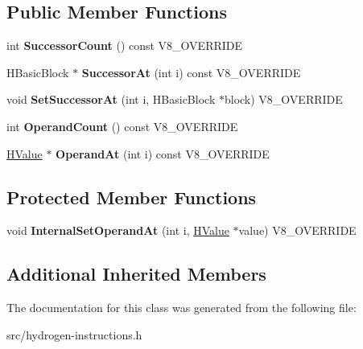 \subsection*{Public Member Functions}
\begin{DoxyCompactItemize}
\item 
\hypertarget{classv8_1_1internal_1_1_h_template_control_instruction_acdac81ca169a1b96efdbdea7b835a503}{}int {\bfseries Successor\+Count} () const V8\+\_\+\+O\+V\+E\+R\+R\+I\+D\+E\label{classv8_1_1internal_1_1_h_template_control_instruction_acdac81ca169a1b96efdbdea7b835a503}

\item 
\hypertarget{classv8_1_1internal_1_1_h_template_control_instruction_a0594d3ba5bd3118a89b14a082b179407}{}H\+Basic\+Block $\ast$ {\bfseries Successor\+At} (int i) const V8\+\_\+\+O\+V\+E\+R\+R\+I\+D\+E\label{classv8_1_1internal_1_1_h_template_control_instruction_a0594d3ba5bd3118a89b14a082b179407}

\item 
\hypertarget{classv8_1_1internal_1_1_h_template_control_instruction_a310afaf5b5b076b110d1168996643b4e}{}void {\bfseries Set\+Successor\+At} (int i, H\+Basic\+Block $\ast$block) V8\+\_\+\+O\+V\+E\+R\+R\+I\+D\+E\label{classv8_1_1internal_1_1_h_template_control_instruction_a310afaf5b5b076b110d1168996643b4e}

\item 
\hypertarget{classv8_1_1internal_1_1_h_template_control_instruction_a6c53efb11248447ebe4adbe166bff1d8}{}int {\bfseries Operand\+Count} () const V8\+\_\+\+O\+V\+E\+R\+R\+I\+D\+E\label{classv8_1_1internal_1_1_h_template_control_instruction_a6c53efb11248447ebe4adbe166bff1d8}

\item 
\hypertarget{classv8_1_1internal_1_1_h_template_control_instruction_a32a7182de377f0a8c884d0fc6a7eb691}{}\hyperlink{classv8_1_1internal_1_1_h_value}{H\+Value} $\ast$ {\bfseries Operand\+At} (int i) const V8\+\_\+\+O\+V\+E\+R\+R\+I\+D\+E\label{classv8_1_1internal_1_1_h_template_control_instruction_a32a7182de377f0a8c884d0fc6a7eb691}

\end{DoxyCompactItemize}
\subsection*{Protected Member Functions}
\begin{DoxyCompactItemize}
\item 
\hypertarget{classv8_1_1internal_1_1_h_template_control_instruction_ac39ae122171298866161b12ee4790f72}{}void {\bfseries Internal\+Set\+Operand\+At} (int i, \hyperlink{classv8_1_1internal_1_1_h_value}{H\+Value} $\ast$value) V8\+\_\+\+O\+V\+E\+R\+R\+I\+D\+E\label{classv8_1_1internal_1_1_h_template_control_instruction_ac39ae122171298866161b12ee4790f72}

\end{DoxyCompactItemize}
\subsection*{Additional Inherited Members}


The documentation for this class was generated from the following file\+:\begin{DoxyCompactItemize}
\item 
src/hydrogen-\/instructions.\+h\end{DoxyCompactItemize}
